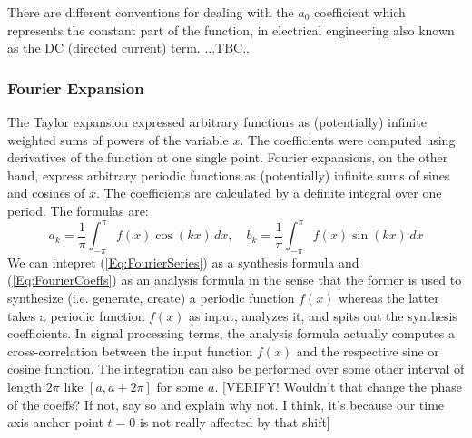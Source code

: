 \medskip
There are different conventions for dealing with the $a_0$ coefficient which represents the constant part of the function, in electrical engineering also known as the DC (directed current) term. ...TBC..




\subsubsection{Fourier Expansion}
The Taylor expansion expressed arbitrary functions as (potentially) infinite weighted sums of powers of the variable $x$. The coefficients were computed using derivatives of the function at one single point. Fourier expansions, on the other hand, express arbitrary periodic functions as (potentially) infinite sums of sines and cosines of $x$. The coefficients are calculated by a definite integral over one period. The formulas are:
\begin{equation}
\label{Eq:FourierCoeffs}	
 a_k = \frac{1}{\pi} \int_{-\pi}^{\pi} f(x) \cos(k x) \, dx, \quad
 b_k = \frac{1}{\pi} \int_{-\pi}^{\pi} f(x) \sin(k x) \, dx 
\end{equation}
We can intepret (\ref{Eq:FourierSeries}) as a synthesis formula and (\ref{Eq:FourierCoeffs}) as an analysis formula in the sense that the former is used to synthesize (i.e. generate, create) a periodic function $f(x)$ whereas the latter takes a periodic function $f(x)$ as input, analyzes it, and spits out the synthesis coefficients. In signal processing terms,  the analysis formula actually computes a cross-correlation between the input function $f(x)$ and the respective sine or cosine function. The integration can also be performed over some other interval of length $2\pi$ like $[a,a+2\pi]$ for some $a$. [VERIFY! Wouldn't that change the phase of the coeffs? If not, say so and explain why not. I think, it's because our time axis anchor point $t=0$ is not really affected by that shift] 

